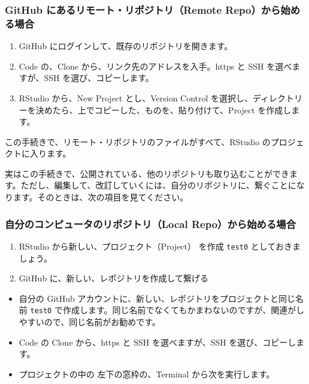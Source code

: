 \documentclass[
]{bxjsbook}
\providecommand{\tightlist}{%
  \setlength{\itemsep}{0pt}\setlength{\parskip}{0pt}}
\theoremstyle{definition}
\theoremstyle{definition}
\theoremstyle{definition}
\theoremstyle{definition}
\theoremstyle{remark}
\begin{document}
\hypertarget{github-ux306bux3042ux308bux30eaux30e2ux30fcux30c8ux30eaux30ddux30b8ux30c8ux30earemote-repoux304bux3089ux59cbux3081ux308bux5834ux5408}{%
\subsubsection{GitHub にあるリモート・リポジトリ（Remote Repo）から始める場合}\label{github-ux306bux3042ux308bux30eaux30e2ux30fcux30c8ux30eaux30ddux30b8ux30c8ux30earemote-repoux304bux3089ux59cbux3081ux308bux5834ux5408}}

\begin{enumerate}
\def\labelenumi{\arabic{enumi}.}
\tightlist
\item
  GitHub にログインして、既存のリポジトリを開きます。
\item
  Code の、Clone から、リンク先のアドレスを入手。https と SSH を選べますが、SSH を選び、コピーします。
\item
  RStudio から、New Project とし、Version Control を選択し、ディレクトリーを決めたら、上でコピーした、ものを、貼り付けて、Project を作成します。
\end{enumerate}

この手続きで、リモート・リポジトリのファイルがすべて、RStudio のプロジェクトに入ります。

実はこの手続きで、公開されている、他のリポジトリも取り込むことができます。ただし、編集して、改訂していくには、自分のリポジトリに、繋ぐことになります。そのときは、次の項目を見てください。

\hypertarget{ux81eaux5206ux306eux30b3ux30f3ux30d4ux30e5ux30fcux30bfux306eux30eaux30ddux30b8ux30c8ux30ealocal-repoux304bux3089ux59cbux3081ux308bux5834ux5408}{%
\subsubsection{自分のコンピュータのリポジトリ（Local Repo）から始める場合}\label{ux81eaux5206ux306eux30b3ux30f3ux30d4ux30e5ux30fcux30bfux306eux30eaux30ddux30b8ux30c8ux30ealocal-repoux304bux3089ux59cbux3081ux308bux5834ux5408}}

\begin{enumerate}
\def\labelenumi{\arabic{enumi}.}
\tightlist
\item
  RStudio から新しい、プロジェクト（Project） を作成 \texttt{test0} としておきましょう。
\item
  GitHub に、新しい、レポジトリを作成して繋げる
\end{enumerate}

\begin{itemize}
\tightlist
\item
  自分の GitHub アカウントに、新しい、レポジトリをプロジェクトと同じ名前 \texttt{test0} で作成します。同じ名前でなくてもかまわないのですが、関連がしやすいので、同じ名前がお勧めです。
\item
  Code の Clone から、https と SSH を選べますが、SSH を選び、コピーします。
\item
  プロジェクトの中の 左下の窓枠の、Terminal から次を実行します。
\end{itemize}
\end{document}
